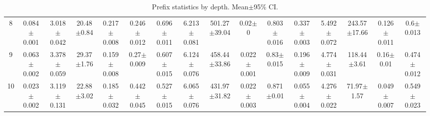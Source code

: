 \documentclass{article}
\theoremstyle{plain}
\theoremstyle{definition}
\theoremstyle{remark}
\begin{document}
\begin{table}[!htbp]
{\begin{tabular}{cccccccccccccccc}
8 & 0.084$\pm$0.001 & 3.018$\pm$0.042 & 20.48$\pm$0.84 & 0.217$\pm$0.008 & 0.246$\pm$0.012 & 0.696$\pm$0.011 & 6.213$\pm$0.081 & 501.27$\pm$39.04 & 0.02$\pm$0 & 0.803$\pm$0.016 & 0.337$\pm$0.003 & 5.492$\pm$0.072 & 243.57$\pm$17.66 & 0.126$\pm$0.011 & 0.6$\pm$0.013 \\
9 & 0.063$\pm$0.002 & 3.378$\pm$0.059 & 29.37$\pm$1.76 & 0.159$\pm$0.008 & 0.27$\pm$0.009 & 0.607$\pm$0.015 & 6.124$\pm$0.076 & 458.44$\pm$33.86 & 0.022$\pm$0.001 & 0.83$\pm$0.015 & 0.196$\pm$0.009 & 4.774$\pm$0.031 & 118.44$\pm$3.61 & 0.16$\pm$0.01 & 0.474$\pm$0.012 \\
10 & 0.023$\pm$0.002 & 3.119$\pm$0.131 & 22.88$\pm$3.02 & 0.185$\pm$0.032 & 0.442$\pm$0.045 & 0.527$\pm$0.015 & 6.065$\pm$0.076 & 431.97$\pm$31.82 & 0.022$\pm$0.003 & 0.871$\pm$0.01 & 0.055$\pm$0.004 & 4.276$\pm$0.022 & 71.97$\pm$1.57 & 0.049$\pm$0.007 & 0.549$\pm$0.023 \\
\bottomrule
\end{tabular}
}%
\caption{Prefix statistics by depth. Mean$\pm$95\% CI.}
\label{tab:prefix_bylen_base}
\end{table}
\end{document}
